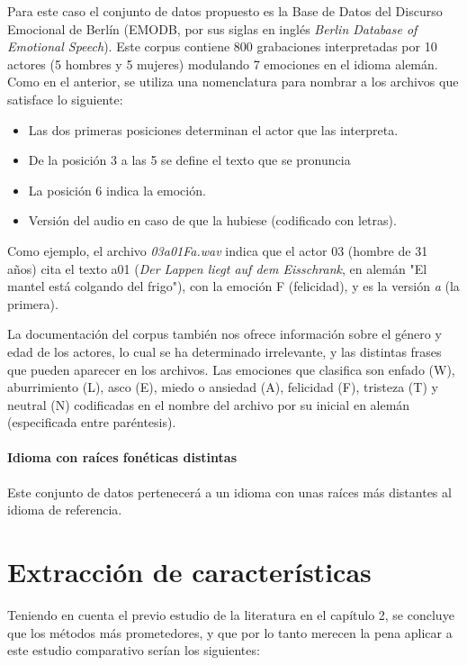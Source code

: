 \documentclass[11pt,a4paper,spanish]{book}
\begin{document}
	Para este caso el conjunto de datos propuesto es la Base de Datos del Discurso Emocional de Berlín (EMODB, por sus siglas en inglés \emph{Berlin Database of Emotional Speech}). Este corpus contiene 800 grabaciones interpretadas por 10 actores (5 hombres y 5 mujeres) modulando 7 emociones en el idioma alemán. Como en el anterior, se utiliza una nomenclatura para nombrar a los archivos que satisface lo siguiente:
	\begin{itemize}
		\item Las dos primeras posiciones determinan el actor que las interpreta.
		\item De la posición 3 a las 5 se define el texto que se pronuncia
		\item La posición 6 indica la emoción.
		\item Versión del audio en caso de que la hubiese (codificado con letras).
	\end{itemize}

	Como ejemplo, el archivo \emph{03a01Fa.wav} indica que el actor 03 (hombre de 31 años) cita el texto a01 (\emph{Der Lappen liegt auf dem Eisschrank}, en alemán "El mantel está colgando del frigo"), con la emoción F (felicidad), y es la versión \emph{a} (la primera).
	
	La documentación del corpus también nos ofrece información sobre el género y edad de los actores, lo cual se ha determinado irrelevante, y las distintas frases que pueden aparecer en los archivos.
	Las emociones que clasifica son enfado (W), aburrimiento (L), asco (E), miedo o ansiedad (A), felicidad (F), tristeza (T) y neutral (N) codificadas en el nombre del archivo por su inicial en alemán (especificada entre paréntesis).


	
	\paragraph{Idioma con raíces fonéticas distintas} Este conjunto de datos pertenecerá a un idioma con unas raíces más distantes al idioma de referencia.\\
	
	
	\section{Extracción de características}
	Teniendo en cuenta el previo estudio de la literatura en el capítulo 2, se concluye que los métodos más prometedores, y que por lo tanto merecen la pena aplicar a este estudio comparativo serían los siguientes:
\end{document}
